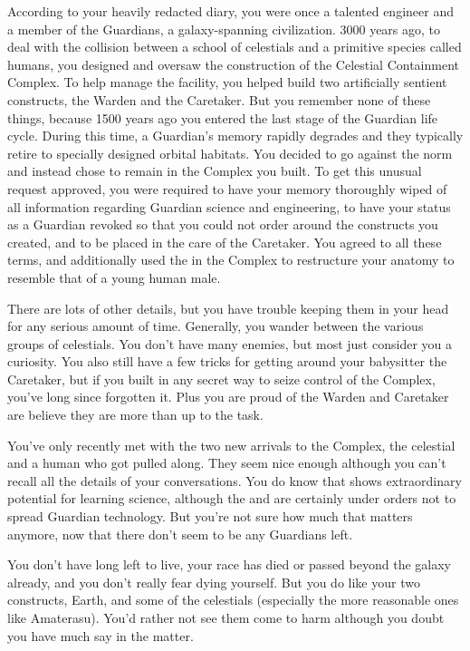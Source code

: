 \documentclass[char]{guardians}
\begin{document}
\name{\cJascha{}}

According to your heavily redacted diary, you were once a talented engineer and a member of the Guardians, a galaxy-spanning civilization. 3000 years ago, to deal with the collision between a school of celestials and a primitive species called humans, you designed and oversaw the construction of the Celestial Containment Complex. To help manage the facility, you helped build two artificially sentient constructs, the Warden and the Caretaker. But you remember none of these things, because 1500 years ago you entered the last stage of the Guardian life cycle. During this time, a Guardian's memory rapidly degrades and they typically retire to specially designed orbital habitats. You decided to go against the norm and instead chose to remain in the Complex you built. To get this unusual request approved, you were required to have your memory thoroughly wiped of all information regarding Guardian science and engineering, to have your status as a Guardian revoked so that you could not order around the constructs you created, and to be placed in the care of the Caretaker. You agreed to all these terms, and additionally used the \assembler{} in the Complex to restructure your anatomy to resemble that of a young human male.

There are lots of other details, but you have trouble keeping them in your head for any serious amount of time. Generally, you wander between the various groups of celestials. You don't have many enemies, but most just consider you a curiosity. You also still have a few tricks for getting around your babysitter the Caretaker, but if you built in any secret way to seize control of the Complex, you've long since forgotten it. Plus you are proud of the Warden and Caretaker are believe they are more than up to the task.

You've only recently met with the two new arrivals to the Complex, the celestial \cUnity{} and a human \cKachiko{\intro} who got pulled along. They seem nice enough although you can't recall all the details of your conversations. You do know that \cKachiko{} shows extraordinary potential for learning science, although the \cCaretaker{} and \cWarden{} are certainly under orders not to spread Guardian technology. But you're not sure how much that matters anymore, now that there don't seem to be any Guardians left.

You don't have long left to live, your race has died or passed beyond the galaxy already, and you don't really fear dying yourself. But you do like your two constructs, Earth, and some of the celestials (especially the more reasonable ones like Amaterasu). You'd rather not see them come to harm although you doubt you have much say in the matter.
\end{document}
